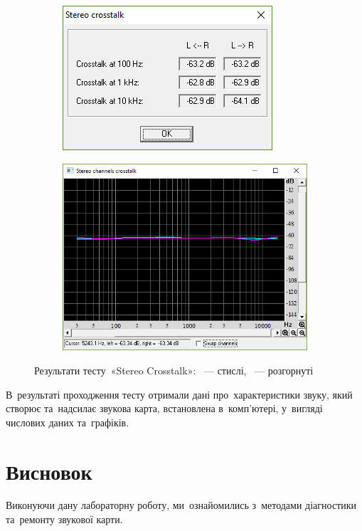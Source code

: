 \documentclass[
	a4paper,
	oneside,
	BCOR = 10mm,
	DIV = 12,
	12pt,
	headings = normal,
]{scrartcl}
\begin{document}
			\begin{figure}[!htbp]
				\centering
				\begin{subfigure}[t]{\columnwidth / 2}
					\centering
					\includegraphics[height=08\baselineskip]{./assets/y03s02-pcdiag-lab-07-p06-01-crosstalk.png}
					\caption{}
					\label{subfig:sca-crosstalk}
				\end{subfigure}%
				\begin{subfigure}[t]{\columnwidth / 2}
					\centering
					\includegraphics[height=08\baselineskip]{./assets/y03s02-pcdiag-lab-07-p06-02-crosstalk-det.png}
					\caption{}
					\label{subfig:sca-crosstalk-det}
				\end{subfigure}
				\caption{Результати тесту~«\textenglish{Stereo Crosstalk}»: ~— стислі, ~— розгорнуті}
				\label{fig:sca-crosstalk}
			\end{figure}

			В~результаті проходження тесту отримали дані про~характеристики звуку, який створює та~надсилає звукова карта, встановлена в~комп'ютері, у~вигляді числових даних та~графіків. 


	\section{Висновок}
		Виконуючи дану лабораторну роботу, ми~ознайомились з~методами діагностики та~ремонту звукової карти.
\end{document}
